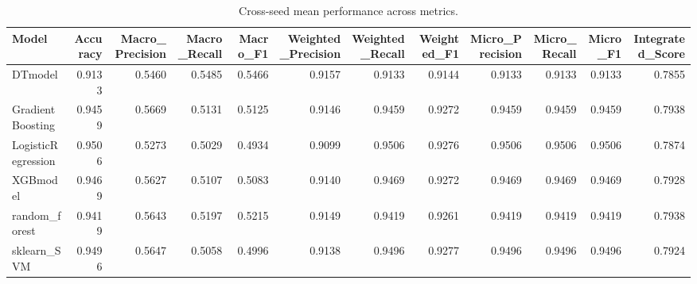 \begin{table}[t]
\centering
\begin{tabular}{lrrrrrrrrrrr}
\toprule
Model & Accuracy & Macro_Precision & Macro_Recall & Macro_F1 & Weighted_Precision & Weighted_Recall & Weighted_F1 & Micro_Precision & Micro_Recall & Micro_F1 & Integrated_Score \\
\midrule
DTmodel & 0.9133 & 0.5460 & 0.5485 & 0.5466 & 0.9157 & 0.9133 & 0.9144 & 0.9133 & 0.9133 & 0.9133 & 0.7855 \\
GradientBoosting & 0.9459 & 0.5669 & 0.5131 & 0.5125 & 0.9146 & 0.9459 & 0.9272 & 0.9459 & 0.9459 & 0.9459 & 0.7938 \\
LogisticRegression & 0.9506 & 0.5273 & 0.5029 & 0.4934 & 0.9099 & 0.9506 & 0.9276 & 0.9506 & 0.9506 & 0.9506 & 0.7874 \\
XGBmodel & 0.9469 & 0.5627 & 0.5107 & 0.5083 & 0.9140 & 0.9469 & 0.9272 & 0.9469 & 0.9469 & 0.9469 & 0.7928 \\
random_forest & 0.9419 & 0.5643 & 0.5197 & 0.5215 & 0.9149 & 0.9419 & 0.9261 & 0.9419 & 0.9419 & 0.9419 & 0.7938 \\
sklearn_SVM & 0.9496 & 0.5647 & 0.5058 & 0.4996 & 0.9138 & 0.9496 & 0.9277 & 0.9496 & 0.9496 & 0.9496 & 0.7924 \\
\bottomrule
\end{tabular}
\caption{Cross-seed mean performance across metrics.}
\label{tab:cross_seed_mean}
\end{table}